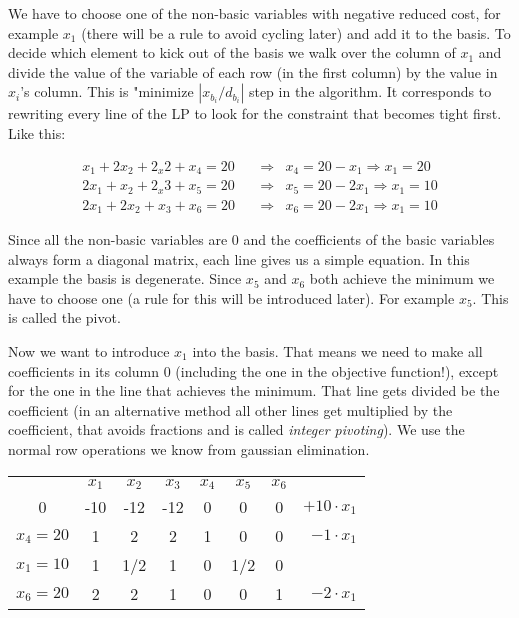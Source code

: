\begin{Ex}
We have to choose one of the non-basic variables with negative reduced cost, for example $x_1$ (there will be a rule to avoid cycling later) and add it to the basis. To decide which element to kick out of the basis we walk over the column of $x_1$ and divide the value of the variable of each row (in the first column) by the value in $x_i$'s column. This is "minimize $|x_{b_i}/d_{b_i}|$ step in the algorithm. It corresponds to rewriting every line of the LP to look for the constraint that becomes tight first. Like this:

\begin{align*}
x_1+2x_2 +2_x2 + x_4 = 20 &\quad \Rightarrow & x_4 = 20-x_1 \Rightarrow x_1= 20\\
2x_1 +x_2+2_x3 +x_5 =20 &\quad \Rightarrow & x_5 = 20 -2x_1 \Rightarrow x_1=10 \\
 2x_1+2x_2 +x_3 +x_6 = 20 &\quad \Rightarrow& x_6=20-2x_1 \Rightarrow x_1 = 10
\end{align*}

Since all the non-basic variables are 0 and the coefficients of the basic variables always form a diagonal matrix, each line gives us a simple equation. In this example the basis is degenerate. Since $x_5$ and $x_6$ both achieve the minimum we have to choose one (a rule for this will be introduced later). For example $x_5$. This is called the pivot.

Now we want to introduce $x_1$ into the basis. That means we need to make all coefficients in its column 0 (including the one in the objective function!), except for the one in the line that achieves the minimum. That line gets divided be the coefficient (in an alternative method all other lines get multiplied by the coefficient, that avoids fractions and is called \emph{integer pivoting}). We use the normal row operations we know from gaussian elimination. 

\begin{center}
\begin{tabular}{c|ccccccr}
  & $x_1$ & $x_2$ & $x_3$ & $x_4$ & $x_5$ & $x_6$ \\\cline{1-7}
0 & -10 & -12 & -12 & 0 & 0 & 0 &\hspace{1cm} $+10\cdot x_1$\\
$x_4=20$ & 1 & 2 & 2 & 1 &  0 & 0 &\hspace{1cm} $-1\cdot x_1$\\
$x_1=10$ & 1 & 1/2 & 1 & 0 &  1/2 & 0\\
$x_6=20$ & 2 & 2 & 1 & 0 &  0 & 1 &\hspace{1cm} $-2\cdot x_1$\\
\end{tabular}
\end{center}


\end{Ex}
